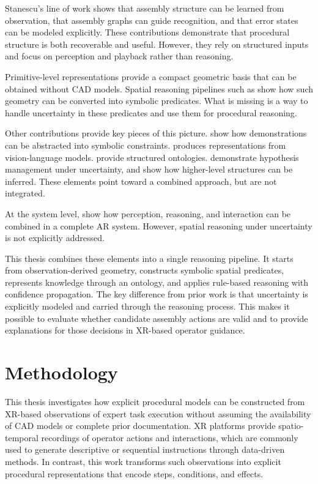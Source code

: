 \documentclass[11pt,titlepage,openright]{book}
\begin{document}
Stanescu's line of work \citet{Stanescu_2022,Stanescu_2023,Stanescu_2024} shows that assembly structure can be learned from observation, that assembly graphs can guide recognition, and that error states can be modeled explicitly. These contributions demonstrate that procedural structure is both recoverable and useful. However, they rely on structured inputs and focus on perception and playback rather than reasoning.

Primitive-level representations \citet{Mazur_2024} provide a compact geometric basis that can be obtained without CAD models. Spatial reasoning pipelines such as \citet{Haesler_2025} show how such geometry can be converted into symbolic predicates. What is missing is a way to handle uncertainty in these predicates and use them for procedural reasoning.

Other contributions provide key pieces of this picture. \citet{Sen_2024} show how demonstrations can be abstracted into symbolic constraints.  \citet{Zhao2025VideoToBT} produces representations from vision-language models. \citet{Zhu_2022} provide structured ontologies. \citet{WangEtAl2018} demonstrate hypothesis management under uncertainty, and \citet{Shi2020} show how higher-level structures can be inferred. These elements point toward a combined approach, but are not integrated.

At the system level, \citet{McGowan2025TIM} show how perception, reasoning, and interaction can be combined in a complete AR system. However, spatial reasoning under uncertainty is not explicitly addressed.

This thesis combines these elements into a single reasoning pipeline. It starts from observation-derived geometry, constructs symbolic spatial predicates, represents knowledge through an ontology, and applies rule-based reasoning with confidence propagation. The key difference from prior work is that uncertainty is explicitly modeled and carried through the reasoning process. This makes it possible to evaluate whether candidate assembly actions are valid and to provide explanations for those decisions in XR-based operator guidance.



\chapter{Methodology}
\label{cha:methodology}

This thesis investigates how explicit procedural models can be constructed from XR-based observations of expert task execution without assuming the availability of CAD models or complete prior documentation. XR platforms provide spatio-temporal recordings of operator actions and interactions, which are commonly used to generate descriptive or sequential instructions through data-driven methods. In contrast, this work transforms such observations into explicit procedural representations that encode steps, conditions, and effects.
\end{document}
